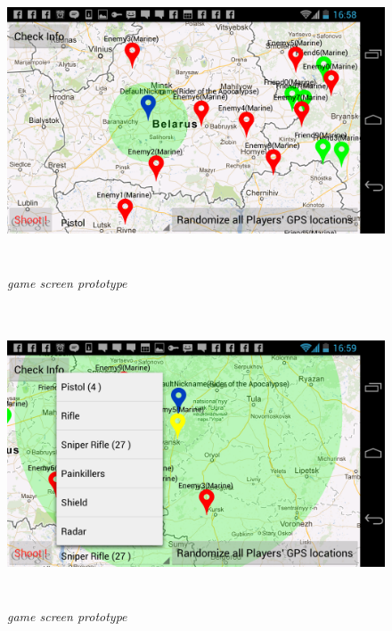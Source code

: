 \documentclass{article}
\begin{document}
\begin{figure}
\includegraphics[height=3.5in,width=6.23in]{./images/android_screenshots/ui_prototype/UI_prototype_3.png}  
\caption{\small \sl game screen prototype \label{fig:UIPrototype3}}
\end{figure}

\begin{figure}
\includegraphics[height=3.5in,width=6.23in]{./images/android_screenshots/ui_prototype/UI_prototype_4.png}  
\caption{\small \sl game screen prototype \label{fig:UIPrototype4}}
\end{figure}
\end{document}
